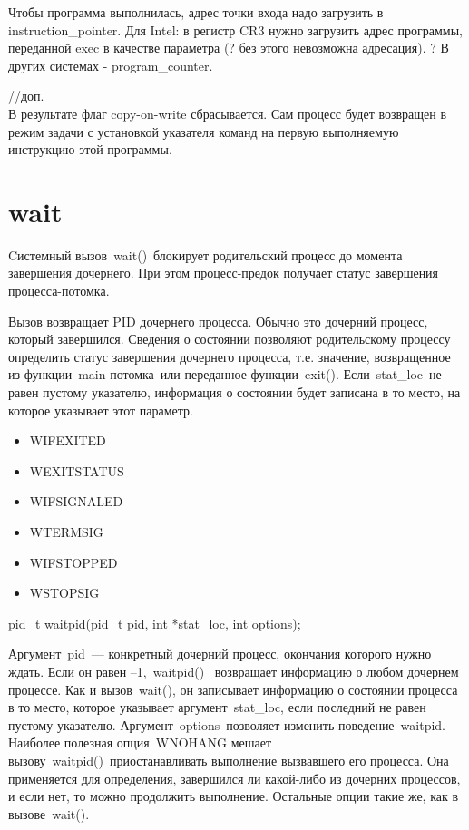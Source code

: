 Чтобы программа выполнилась, адрес точки входа надо загрузить в instruction\_pointer.
Для Intel: в регистр CR3 нужно загрузить адрес программы, переданной exec в качестве параметра (? без этого невозможна адресация).
? В других системах - program\_counter.

//доп.\\
В результате флаг copy-on-write сбрасывается. Сам процесс будет возвращен в режим задачи с установкой указателя команд на первую выполняемую инструкцию этой программы.

\section{wait}
Cистемный вызов wait() блокирует родительский процесс до момента завершения дочернего.
При этом процесс-предок получает статус завершения процесса-потомка.

Вызов возвращает PID дочернего процесса. Обычно это дочерний процесс, который завершился. Сведения о состоянии позволяют родительскому процессу определить статус завершения дочернего процесса, т.е. значение, возвращенное из функции main потомка или переданное функции exit(). Если stat\_loc не равен пустому указателю, информация о состоянии будет записана в то место, на которое указывает этот параметр.

\begin{itemize}
	\item WIFEXITED
	\item WEXITSTATUS
	\item WIFSIGNALED
	\item WTERMSIG
	\item WIFSTOPPED
	\item WSTOPSIG
\end{itemize}

pid\_t waitpid(pid\_t pid, int *stat\_loc, int options);

Аргумент pid — конкретный дочерний процесс, окончания которого нужно ждать. Если он равен –1, waitpid()  возвращает  информацию о любом дочернем процессе. Как и вызов wait(), он записывает информацию о состоянии процесса в то место, которое указывает аргумент stat\_loc, если последний не равен пустому указателю. Аргумент options позволяет изменить поведение waitpid. Наиболее полезная опция WNOHANG мешает вызову waitpid() приостанавливать выполнение вызвавшего его процесса. Она применяется для определения, завершился ли какой-либо из дочерних процессов, и если нет, то можно продолжить выполнение. Остальные опции такие же, как в вызове wait().

